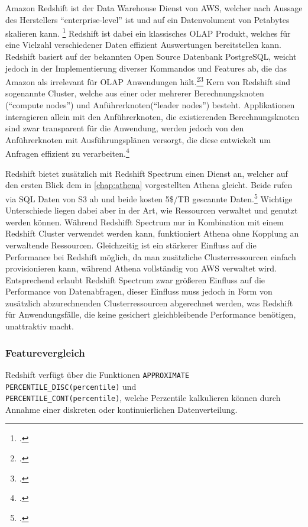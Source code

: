 Amazon Redshift ist der Data Warehouse Dienst von \ac{AWS}, welcher nach Aussage des Herstellers \enquote{enterprise-level} ist und auf ein Datenvolument von Petabytes skalieren kann. \footcite[Vgl.][1]{AmazonWebServicesInc..o.J.g} Redshift ist dabei ein klassisches \ac{OLAP} Produkt, welches für eine Vielzahl verschiedener Daten effizient Auswertungen bereitstellen kann. Redshift basiert auf der bekannten Open Source Datenbank PostgreSQL, weicht jedoch in der Implementierung diverser Kommandos und Features ab, die das Amazon als irrelevant für \ac{OLAP} Anwendungen hält.\footcite[Vgl.][4]{AmazonWebServicesInc..o.J.g}\nzitat\footcite[Vgl.][428\psqq]{AmazonWebServicesInc..o.J.g} Kern von Redshift sind sogenannte Cluster, welche aus einer oder mehrerer Berechnungsknoten (\enquote{compute nodes}) und Anführerknoten(\enquote{leader nodes}) besteht. Applikationen interagieren allein mit den Anführerknoten, die existierenden Berechnungsknoten sind zwar transparent für die Anwendung, werden jedoch von den Anführerknoten mit Ausführungsplänen versorgt, die diese entwickelt um Anfragen effizient zu verarbeiten.\footcite[Vgl.][4]{AmazonWebServicesInc..o.J.g}

Redshift bietet zusätzlich mit Redshift Spectrum einen Dienst an, welcher auf den ersten Blick dem in \autoref{chap:athena} vorgestellten Athena gleicht. Beide rufen via \ac{SQL} Daten von \ac{S3} ab und beide kosten 5\$/TB gescannte Daten.\footcite[Vgl. auch im Folgenden][]{Smallcombe.2020} Wichtige Unterschiede liegen dabei aber in der Art, wie Ressourcen verwaltet und genutzt werden können. Während Redshifft Spectrum nur in Kombination mit einem Redshift Cluster verwendet werden kann, funktioniert Athena ohne Kopplung an verwaltende Ressourcen. Gleichzeitig ist ein stärkerer Einfluss auf die Performance bei Redshift möglich, da man zusätzliche Clusterressourcen einfach provisionieren kann, während Athena vollständig von \ac{AWS} verwaltet wird. Entsprechend erlaubt Redshift Spectrum zwar größeren Einfluss auf die Performance von Datenabfragen, dieser Einfluss muss jedoch in Form von zusätzlich abzurechnenden Clusterressourcen abgerechnet werden, was Redshift für Anwendungsfälle, die keine gesichert gleichbleibende Performance benötigen, unattraktiv macht.


\subsubsection{Featurevergleich}
Redshift verfügt über die Funktionen \texttt{APPROXIMATE PERCENTILE_DISC(percentile)} und \\ \texttt{PERCENTILE_CONT(percentile)}, welche Perzentile kalkulieren können durch Annahme einer diskreten oder kontinuierlichen Datenverteilung.

